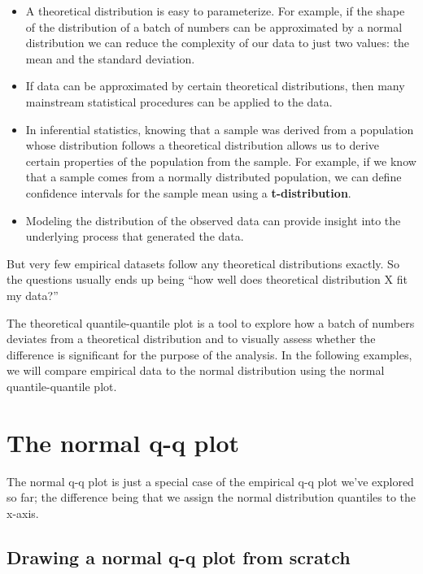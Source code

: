 \documentclass[]{book}
\begin{document}
\begin{itemize}
\item
  A theoretical distribution is easy to parameterize. For example, if the shape of the distribution of a batch of numbers can be approximated by a normal distribution we can reduce the complexity of our data to just two values: the mean and the standard deviation.
\item
  If data can be approximated by certain theoretical distributions, then many mainstream statistical procedures can be applied to the data.
\item
  In inferential statistics, knowing that a sample was derived from a population whose distribution follows a theoretical distribution allows us to derive certain properties of the population from the sample. For example, if we know that a sample comes from a normally distributed population, we can define confidence intervals for the sample mean using a \textbf{t-distribution}.
\item
  Modeling the distribution of the observed data can provide insight into the underlying process that generated the data.
\end{itemize}

But very few empirical datasets follow any theoretical distributions exactly. So the questions usually ends up being ``how well does theoretical distribution X fit my data?''

The theoretical quantile-quantile plot is a tool to explore how a batch of numbers deviates from a theoretical distribution and to visually assess whether the difference is significant for the purpose of the analysis. In the following examples, we will compare empirical data to the normal distribution using the normal quantile-quantile plot.

\hypertarget{the-normal-q-q-plot}{%
\section{The normal q-q plot}\label{the-normal-q-q-plot}}

The normal q-q plot is just a special case of the empirical q-q plot we've explored so far; the difference being that we assign the normal distribution quantiles to the x-axis.

\hypertarget{drawing-a-normal-q-q-plot-from-scratch}{%
\subsection{Drawing a normal q-q plot from scratch}\label{drawing-a-normal-q-q-plot-from-scratch}}
\end{document}
